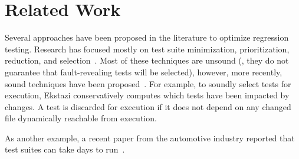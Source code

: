 \section{Related Work}
\label{sec:related}

Several approaches have been proposed in the literature to optimize
regression testing.  Research has focused mostly on test suite
minimization, prioritization, reduction, and
selection~\cite{yoo-harman-stvr2012}.  Most of these techniques are
unsound (\ie{}, they do not guarantee that fault-revealing tests will
be selected), however, more recently, sound techniques have been
proposed~\cite{gligoric-etal-issta2015,soetens-etal-2016}.  For
example, to soundly select tests for execution,
Ekstazi\cite{ekstazi-web,gligoric-etal-issta2015} conservatively
computes which tests have been impacted by changes.  A test is
discarded for execution if it does not depend on any
changed file dynamically reachable from execution.

As another example, a recent paper from the
automotive industry reported that test suites can take days to
run~\cite{artl-etal-icst2015}.
